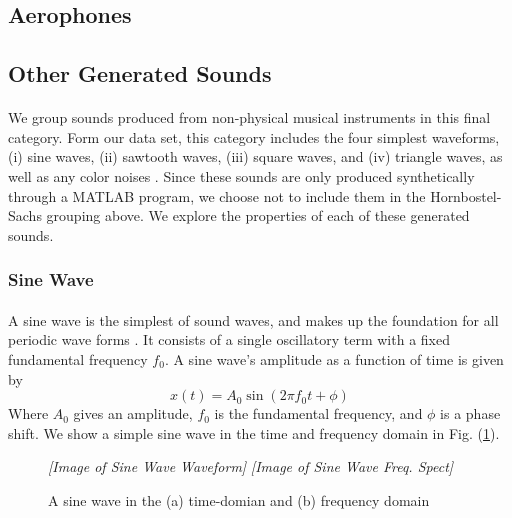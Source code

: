 \documentclass[12pt,letterpaper]{article}
\begin{document}

\subsection{Aerophones}
\label{subsec-Aerophones}


\subsection{Other Generated Sounds}
\label{subsec-Generated}

\paragraph*{}We group sounds produced from non-physical musical instruments in this final category. Form our data set, this category includes the four simplest waveforms, (i) sine waves, (ii) sawtooth waves, (iii) square waves, and (iv) triangle waves, as well as any color noises \cite{White}. Since these sounds are only produced synthetically through a MATLAB program, we choose not to include them in the Hornbostel-Sachs grouping above. We explore the properties of each of these generated sounds.


\subsubsection{Sine Wave}

\paragraph*{}A sine wave is the simplest of sound waves, and makes up the foundation for all periodic wave forms \cite{White,Virtanen}. It consists of a single oscillatory term with a fixed fundamental frequency $f_0$. A sine wave's amplitude as a function of time is given by 
\begin{equation}
\label{eqn-SineWave}
x(t) = A_0 \sin(2\pi f_0 t + \phi)
\end{equation}
Where $A_0$ gives an amplitude, $f_0$ is the fundamental frequency, and $\phi$ is a phase shift. We show a simple sine wave in the time and frequency domain in Fig. (\ref{fig-SineWave}).

\begin{figure}[h]
\begin{center}
	\textit{[Image of Sine Wave Waveform]}
	\textit{[Image of Sine Wave Freq. Spect]}
\end{center}
\caption{A sine wave in the (a) time-domian and (b) frequency domain}
\label{fig-SineWave}
\end{figure} 
\end{document}
